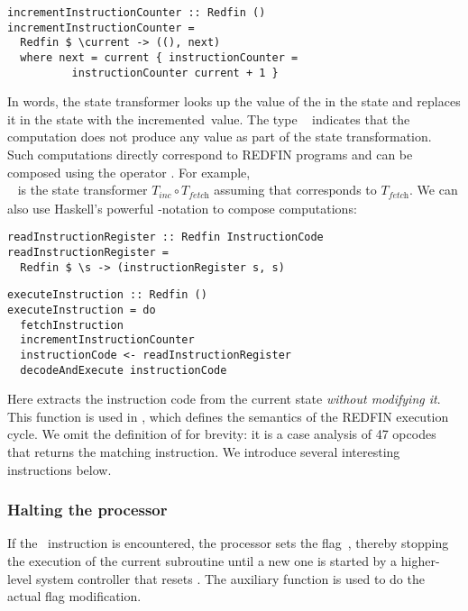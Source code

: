 \begin{verbatim}
incrementInstructionCounter :: Redfin ()
incrementInstructionCounter =
  Redfin $ \current -> ((), next)
  where next = current { instructionCounter =
          instructionCounter current + 1 }
\end{verbatim}


\noindent
In words, the state transformer looks up the value of the 
in the  state and replaces it in the  state with the
incremented~value. The type ~\hs{()} indicates that the computation does not
produce any value as part of the state transformation. Such computations directly
correspond to REDFIN programs and can be composed using the operator \hs{>>}.
For example, \\\hs{>>}~ is
the state transformer $T_\textit{inc} \circ T_\textit{fetch}$ assuming that
 corresponds to $T_\textit{fetch}$. We can also use
Haskell's powerful -notation to compose computations:


\begin{verbatim}
readInstructionRegister :: Redfin InstructionCode
readInstructionRegister =
  Redfin $ \s -> (instructionRegister s, s)
\end{verbatim}

\begin{verbatim}
executeInstruction :: Redfin ()
executeInstruction = do
  fetchInstruction
  incrementInstructionCounter
  instructionCode <- readInstructionRegister
  decodeAndExecute instructionCode
\end{verbatim}

\noindent
Here  extracts the instruction code from the current
state \emph{without modifying it}. This function is used in ,
which defines the semantics of the REDFIN execution cycle. We omit the definition of
 for brevity: it is a case analysis of 47 opcodes that returns
the matching instruction. We introduce several interesting instructions below.


\subsubsection{Halting the processor}
If the~ instruction is encountered, the processor sets the flag~,
thereby stopping the execution of the current subroutine until a new one is
started by a higher-level system controller that resets . The auxiliary
function  is used to do the actual flag modification.


